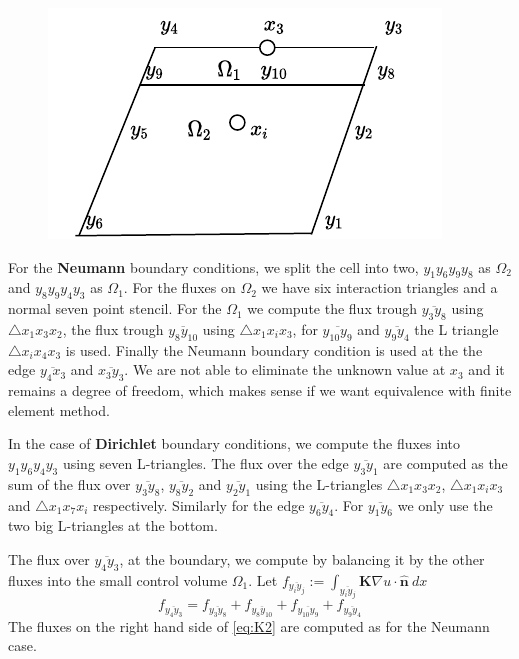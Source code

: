\documentclass[../Main/main.tex]{subfiles}
\begin{document}
	\begin{figure}[H]\label{fig:volumepartition}
		\centering
		\includegraphics{volumepartition.pdf}
	\end{figure}
	For the \textbf{Neumann} boundary conditions, we split the cell into two, $y_1 y_6 y_9 y_8$ as $\Omega_2$ and $y_8 y_9 y_4 y_3$ as  $\Omega_1$. For the fluxes on $\Omega_2$ we have six interaction triangles and a normal seven point stencil. For the $\Omega_1$ we compute the flux trough $\overline{y_3 y_8}$ using $\triangle x_1 x_3 x_2$, the flux trough $\overline{y_8 y_{10}}$ using $\triangle x_1 x_i x_3$, for $\overline{y_{10}y_9}$ and $\overline{y_9 y_4}$ the L triangle  $\triangle x_i x_4 x_3$ is used. Finally the Neumann boundary condition is used at the the edge $\overline{y_4 x_3}$ and $\overline{x_3 y_3}$. We are not able to eliminate the unknown value at $x_3$ and it remains a degree of freedom, which makes sense if we want equivalence with finite element method.
	\par
	In the case of \textbf{Dirichlet} boundary conditions, we compute the fluxes into $y_1 y_6 y_4 y_3$ using seven L-triangles. The flux over the edge $\overline{y_3 y_1}$ are computed as the sum of the flux over $\overline{y_3 y_8}$, $\overline{y_8 y_2}$ and $\overline{y_2 y_1}$ using the L-triangles $\triangle x_1 x_3 x_2$, $\triangle x_1 x_i x_3$ and $\triangle x_1 x_7 x_i$ respectively. Similarly for the edge $\overline{y_6 y_4}$. For $\overline{y_1 y_6}$ we only use the two big L-triangles at the bottom. 
	\par 
	The flux over $\overline{y_4 y_3}$, at the boundary, we compute by balancing it by the other fluxes into the small control volume $\Omega_1$. Let $	f_{\overline{y_i y_j}}:= \int_{\overline{y_i y_j}}  \pmb{K}\nabla u \cdot \pmb{\hat{n}}\ dx $
	\begin{equation}\label{eq:K2}
		f_{\overline{y_4 y_3}} = f_{\overline{y_3 y_8}} + f_{\overline{y_8 y_{10}}}+f_{\overline{y_{10}y_9}}+f_{\overline{y_9 y_4}}
	\end{equation}
	The fluxes on the right hand side of \eqref{eq:K2} are computed as for the Neumann case.
\end{document}
